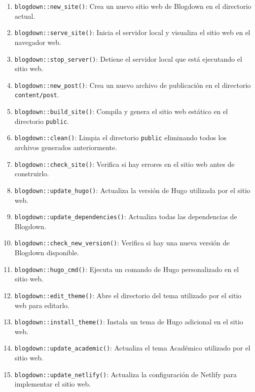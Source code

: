 \documentclass[
  a4paper,
]{article}
\providecommand{\tightlist}{%
  \setlength{\itemsep}{0pt}\setlength{\parskip}{0pt}}\usepackage{longtable,booktabs,array}
\begin{document}
\begin{enumerate}
\def\labelenumi{\arabic{enumi}.}
\tightlist
\item
  \texttt{blogdown::new\_site()}: Crea un nuevo sitio web de Blogdown en
  el directorio actual.
\item
  \texttt{blogdown::serve\_site()}: Inicia el servidor local y visualiza
  el sitio web en el navegador web.
\item
  \texttt{blogdown::stop\_server()}: Detiene el servidor local que está
  ejecutando el sitio web.
\item
  \texttt{blogdown::new\_post()}: Crea un nuevo archivo de publicación
  en el directorio \texttt{content/post}.
\item
  \texttt{blogdown::build\_site()}: Compila y genera el sitio web
  estático en el directorio \texttt{public}.
\item
  \texttt{blogdown::clean()}: Limpia el directorio \texttt{public}
  eliminando todos los archivos generados anteriormente.
\item
  \texttt{blogdown::check\_site()}: Verifica si hay errores en el sitio
  web antes de construirlo.
\item
  \texttt{blogdown::update\_hugo()}: Actualiza la versión de Hugo
  utilizada por el sitio web.
\item
  \texttt{blogdown::update\_dependencies()}: Actualiza todas las
  dependencias de Blogdown.
\item
  \texttt{blogdown::check\_new\_version()}: Verifica si hay una nueva
  versión de Blogdown disponible.
\item
  \texttt{blogdown::hugo\_cmd()}: Ejecuta un comando de Hugo
  personalizado en el sitio web.
\item
  \texttt{blogdown::edit\_theme()}: Abre el directorio del tema
  utilizado por el sitio web para editarlo.
\item
  \texttt{blogdown::install\_theme()}: Instala un tema de Hugo adicional
  en el sitio web.
\item
  \texttt{blogdown::update\_academic()}: Actualiza el tema Académico
  utilizado por el sitio web.
\item
  \texttt{blogdown::update\_netlify()}: Actualiza la configuración de
  Netlify para implementar el sitio web.
\end{enumerate}


\printbibliography
\end{document}
